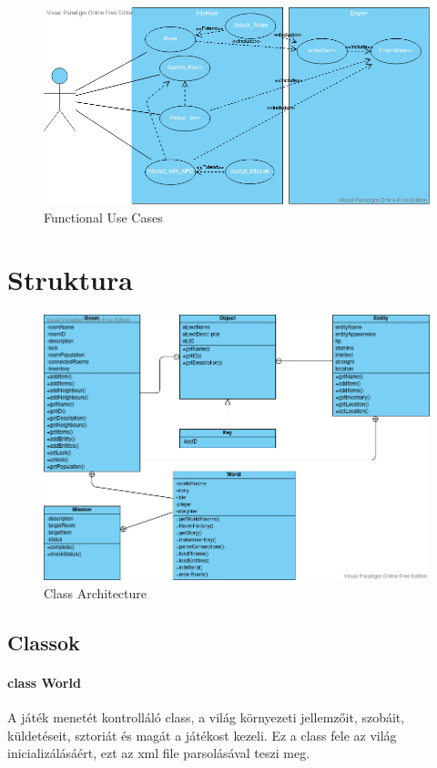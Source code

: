 \documentclass{scrarticle}
\begin{document}
\graphicspath{{../Planning/}}
\begin{figure}[H]\centering
    \includegraphics[width=1.0\columnwidth]{Functional_UseCase.jpg}
    \caption{Functional Use Cases}\label{fig:1}
\end{figure}

\section{Struktura}
\begin{figure}[H]
    \includegraphics[width=0.75\columnwidth]{Class_Architecture.jpg}
    \caption{Class Architecture}\label{fig:2}
\end{figure}

\subsection{Classok}
\paragraph{class World}
A játék menetét kontrolláló class, a világ környezeti jellemzőit, szobáit, küldetéseit, sztoriát és magát a játékost kezeli. Ez a class fele az világ inicializálásáért, ezt az xml file parsolásával teszi meg.
\end{document}
